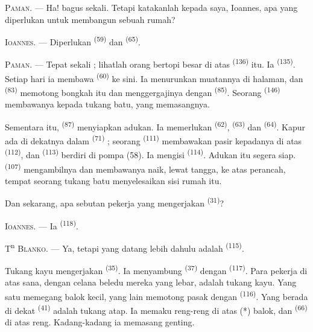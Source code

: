 \VUsaut{3.0mm}
\VUsaut{3.0mm}

\textsc{Paman}. --- Ha! bagus sekali. Tetapi katakanlah kepada saya,
Ioannes, apa yang diperlukan untuk membangun sebuah rumah?

\textsc{Ioannes}. --- Diperlukan 
\textsuperscript{(59)} dan  \textsuperscript{(65)}.

\textsc{Paman}. --- Tepat sekali ; lihatlah orang bertopi besar di
atas  \textsuperscript{(136)} itu. Ia  \textsuperscript{(135)}. Setiap hari ia membawa
 \textsuperscript{(60)} ke sini. Ia
menurunkan muatannya di halaman, dan 
\textsuperscript{(83)} memotong bongkah itu dan menggergajinya dengan
 \textsuperscript{(85)}. Seorang 
\textsuperscript{(146)} membawanya kepada tukang batu, yang
memasangnya.

Sementara itu,  \textsuperscript{(87)} menyiapkan
adukan. Ia memerlukan  \textsuperscript{(62)},
 \textsuperscript{(63)} dan 
\textsuperscript{(64)}. Kapur ada di dekatnya dalam 
\textsuperscript{(71)} ; seorang 
\textsuperscript{(111)} membawakan pasir kepadanya di atas
 \textsuperscript{(112)}, dan  \textsuperscript{(113)} berdiri di pompa (58). Ia mengisi
 \textsuperscript{(114)}. Adukan itu segera siap.
 \textsuperscript{(107)} mengambilnya dan
membawanya naik, lewat tangga, ke atas perancah, tempat seorang tukang
batu menyelesaikan sisi rumah itu.

Dan sekarang, apa sebutan pekerja yang mengerjakan 
\textsuperscript{(31)}?

\textsc{Ioannes}. --- Ia  \textsuperscript{(118)}.

\VUsaut{3.0mm}
\VUsaut{3.0mm}

T\textsuperscript{n} \textsc{Blanko}. --- Ya, tetapi yang datang lebih
dahulu adalah  \textsuperscript{(115)}.

Tukang kayu mengerjakan  \textsuperscript{(35)}. Ia
menyambung  \textsuperscript{(37)} dengan
 \textsuperscript{(117)}. Para pekerja di atas sana,
dengan celana beledu mereka yang lebar, adalah tukang kayu. Yang satu
memegang balok kecil, yang lain memotong pasak dengan 
\textsuperscript{(116)}. Yang berada di dekat 
\textsuperscript{(41)} adalah tukang atap. Ia memaku reng-reng di atas
(*) balok, dan  \textsuperscript{(66)} di
atas reng. Kadang-kadang ia memasang genting.

